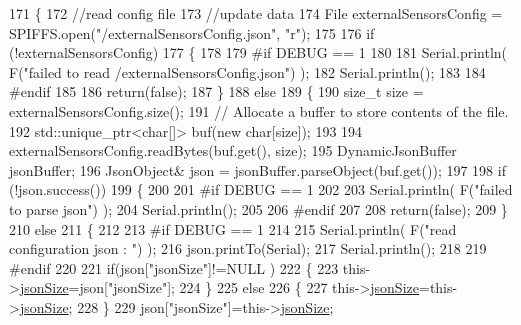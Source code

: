 \begin{DoxyCode}
171 \{
172     \textcolor{comment}{//read config file}
173     \textcolor{comment}{//update data}
174     File externalSensorsConfig = SPIFFS.open(\textcolor{stringliteral}{"/externalSensorsConfig.json"}, \textcolor{stringliteral}{"r"});
175 
176     \textcolor{keywordflow}{if} (!externalSensorsConfig) 
177     \{
178     
179 \textcolor{preprocessor}{    #if DEBUG == 1}
180         
181         Serial.println( F(\textcolor{stringliteral}{"failed to read /externalSensorsConfig.json"}) );
182         Serial.println();
183     
184 \textcolor{preprocessor}{    #endif}
185         
186         \textcolor{keywordflow}{return}(\textcolor{keyword}{false});
187     \}
188     \textcolor{keywordflow}{else}
189     \{
190         \textcolor{keywordtype}{size\_t} size = externalSensorsConfig.size();
191         \textcolor{comment}{// Allocate a buffer to store contents of the file.}
192         std::unique\_ptr<char[]> buf(\textcolor{keyword}{new} \textcolor{keywordtype}{char}[size]);
193 
194         externalSensorsConfig.readBytes(buf.get(), size);
195         DynamicJsonBuffer jsonBuffer;
196         JsonObject& json = jsonBuffer.parseObject(buf.get());
197 
198         \textcolor{keywordflow}{if} (!json.success()) 
199         \{
200         
201 \textcolor{preprocessor}{        #if DEBUG == 1 }
202 
203             Serial.println( F(\textcolor{stringliteral}{"failed to parse json"}) );
204             Serial.println();
205         
206 \textcolor{preprocessor}{        #endif}
207 
208             \textcolor{keywordflow}{return}(\textcolor{keyword}{false});
209         \} 
210         \textcolor{keywordflow}{else}
211         \{
212         
213 \textcolor{preprocessor}{        #if DEBUG == 1 }
214     
215             Serial.println( F(\textcolor{stringliteral}{"read configuration json : "}) );
216             json.printTo(Serial);
217             Serial.println();
218         
219 \textcolor{preprocessor}{        #endif}
220 
221             \textcolor{keywordflow}{if}(json[\textcolor{stringliteral}{"jsonSize"}]!=NULL )
222             \{           
223                 this->\hyperlink{classExternalSensors_acacea86d74d967b57fcff282d26cff57}{jsonSize}=json[\textcolor{stringliteral}{"jsonSize"}];
224             \}
225             \textcolor{keywordflow}{else}
226             \{
227                 this->\hyperlink{classExternalSensors_acacea86d74d967b57fcff282d26cff57}{jsonSize}=this->\hyperlink{classExternalSensors_acacea86d74d967b57fcff282d26cff57}{jsonSize};
228             \}
229             json[\textcolor{stringliteral}{"jsonSize"}]=this->\hyperlink{classExternalSensors_acacea86d74d967b57fcff282d26cff57}{jsonSize};            

\end{DoxyCode}

